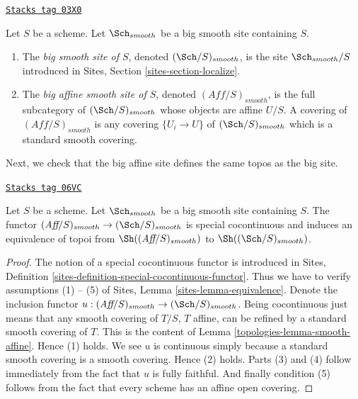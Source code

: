 \begin{definition}
\label{topologies-definition-big-small-smooth}
\href{https://stacks.math.columbia.edu/tag/03X0}{\texttt{Stacks tag 03X0}}

Let $S$ be a scheme. Let $\Sch_{smooth}$ be a big smooth
site containing $S$.
\begin{enumerate}
\item The {\it big smooth site of $S$}, denoted
$(\Sch/S)_{smooth}$, is the site $\Sch_{smooth}/S$
introduced in Sites, Section \ref{sites-section-localize}.
\item The {\it big affine smooth site of $S$}, denoted
$(\textit{Aff}/S)_{smooth}$, is the full subcategory of
$(\Sch/S)_{smooth}$ whose objects are affine $U/S$.
A covering of $(\textit{Aff}/S)_{smooth}$ is any covering
$\{U_i \to U\}$ of $(\Sch/S)_{smooth}$ which is a
standard smooth covering.
\end{enumerate}
\end{definition}

Next, we check that the big affine site defines the same
topos as the big site.

\begin{lemma}
\label{topologies-lemma-affine-big-site-smooth}
\href{https://stacks.math.columbia.edu/tag/06VC}{\texttt{Stacks tag 06VC}}

Let $S$ be a scheme. Let $\Sch_{smooth}$ be a big smooth
site containing $S$.
The functor
$(\textit{Aff}/S)_{smooth} \to (\Sch/S)_{smooth}$
is special cocontinuous and induces an equivalence of topoi from
$\Sh((\textit{Aff}/S)_{smooth})$ to
$\Sh((\Sch/S)_{smooth})$.
\end{lemma}

\begin{proof}

The notion of a special cocontinuous functor is introduced in
Sites, Definition \ref{sites-definition-special-cocontinuous-functor}.
Thus we have to verify assumptions (1) -- (5) of
Sites, Lemma \ref{sites-lemma-equivalence}.
Denote the inclusion functor
$u : (\textit{Aff}/S)_{smooth} \to (\Sch/S)_{smooth}$.
Being cocontinuous just means that any smooth covering of
$T/S$, $T$ affine, can be refined by a standard smooth covering of $T$.
This is the content of
Lemma \ref{topologies-lemma-smooth-affine}.
Hence (1) holds. We see $u$ is continuous simply because a standard
smooth covering is a smooth covering. Hence (2) holds.
Parts (3) and (4) follow immediately from the fact that $u$ is
fully faithful. And finally condition (5) follows from the
fact that every scheme has an affine open covering.
\end{proof}

